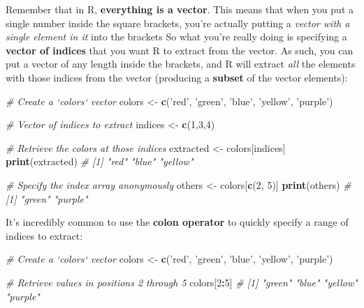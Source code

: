 \documentclass[]{book}
\newenvironment{Shaded}{\begin{snugshade}}{\end{snugshade}}
\newcommand{\KeywordTok}[1]{\textcolor[rgb]{0.13,0.29,0.53}{\textbf{#1}}}
\newcommand{\DecValTok}[1]{\textcolor[rgb]{0.00,0.00,0.81}{#1}}
\newcommand{\StringTok}[1]{\textcolor[rgb]{0.31,0.60,0.02}{#1}}
\newcommand{\CommentTok}[1]{\textcolor[rgb]{0.56,0.35,0.01}{\textit{#1}}}
\newcommand{\OperatorTok}[1]{\textcolor[rgb]{0.81,0.36,0.00}{\textbf{#1}}}
\newcommand{\NormalTok}[1]{#1}
\theoremstyle{definition}
\theoremstyle{definition}
\theoremstyle{remark}
\begin{document}
Remember that in R, \textbf{everything is a vector}. This means that
when you put a single number inside the square brackets, you're actually
putting a \emph{vector with a single element in it} into the brackets So
what you're really doing is specifying a \textbf{vector of indices} that
you want R to extract from the vector. As such, you can put a vector of
any length inside the brackets, and R will extract \emph{all} the
elements with those indices from the vector (producing a \textbf{subset}
of the vector elements):

\begin{Shaded}
\begin{Highlighting}[]
\CommentTok{# Create a `colors` vector}
\NormalTok{colors <-}\StringTok{ }\KeywordTok{c}\NormalTok{(}\StringTok{'red'}\NormalTok{, }\StringTok{'green'}\NormalTok{, }\StringTok{'blue'}\NormalTok{, }\StringTok{'yellow'}\NormalTok{, }\StringTok{'purple'}\NormalTok{)}

\CommentTok{# Vector of indices to extract}
\NormalTok{indices <-}\StringTok{ }\KeywordTok{c}\NormalTok{(}\DecValTok{1}\NormalTok{,}\DecValTok{3}\NormalTok{,}\DecValTok{4}\NormalTok{)}

\CommentTok{# Retrieve the colors at those indices}
\NormalTok{extracted <-}\StringTok{ }\NormalTok{colors[indices]}
\KeywordTok{print}\NormalTok{(extracted)  }\CommentTok{# [1] "red"    "blue"   "yellow"}


\CommentTok{# Specify the index array anonymously}
\NormalTok{others <-}\StringTok{ }\NormalTok{colors[}\KeywordTok{c}\NormalTok{(}\DecValTok{2}\NormalTok{, }\DecValTok{5}\NormalTok{)]}
\KeywordTok{print}\NormalTok{(others)  }\CommentTok{# [1] "green"  "purple"}
\end{Highlighting}
\end{Shaded}

It's incredibly common to use the \textbf{colon operator} to quickly
specify a range of indices to extract:

\begin{Shaded}
\begin{Highlighting}[]
\CommentTok{# Create a `colors` vector}
\NormalTok{colors <-}\StringTok{ }\KeywordTok{c}\NormalTok{(}\StringTok{'red'}\NormalTok{, }\StringTok{'green'}\NormalTok{, }\StringTok{'blue'}\NormalTok{, }\StringTok{'yellow'}\NormalTok{, }\StringTok{'purple'}\NormalTok{)}

\CommentTok{# Retrieve values in positions 2 through 5}
\NormalTok{colors[}\DecValTok{2}\OperatorTok{:}\DecValTok{5}\NormalTok{]  }\CommentTok{# [1] "green"  "blue"   "yellow" "purple"}
\end{Highlighting}
\end{Shaded}
\end{document}
